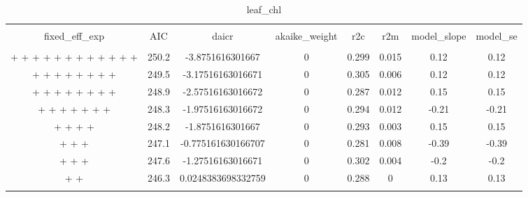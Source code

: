 
\begin{table}[!htbp] \centering 
  \caption{leaf_chl} 
  \label{leaf_chl} 
\begin{tabular}{@{\extracolsep{5pt}} cccccccc} 
\\[-1.8ex]\hline 
\hline \\[-1.8ex] 
fixed\_eff\_exp & AIC & daicr & akaike\_weight & r2c & r2m & model\_slope & model\_se \\ 
\hline \\[-1.8ex] 
 +  +  +  +  +  +  +  +  +  +  +  +  & 250.2 & -3.8751616301667 & 0 & 0.299 & 0.015 & 0.12 & 0.12 \\ 
 +  +  +  +  +  +  +  +  & 249.5 & -3.17516163016671 & 0 & 0.305 & 0.006 & 0.12 & 0.12 \\ 
 +  +  +  +  +  +  +  +  & 248.9 & -2.57516163016672 & 0 & 0.287 & 0.012 & 0.15 & 0.15 \\ 
 +  +  +  +  +  +  +  & 248.3 & -1.97516163016672 & 0 & 0.294 & 0.012 & -0.21 & -0.21 \\ 
 +  +  +  +  & 248.2 & -1.8751616301667 & 0 & 0.293 & 0.003 & 0.15 & 0.15 \\ 
 +  +  +  & 247.1 & -0.775161630166707 & 0 & 0.281 & 0.008 & -0.39 & -0.39 \\ 
 +  +  +  & 247.6 & -1.27516163016671 & 0 & 0.302 & 0.004 & -0.2 & -0.2 \\ 
 +  +  & 246.3 & 0.0248383698332759 & 0 & 0.288 & 0 & 0.13 & 0.13 \\ 
\hline \\[-1.8ex] 
\end{tabular} 
\end{table} 
